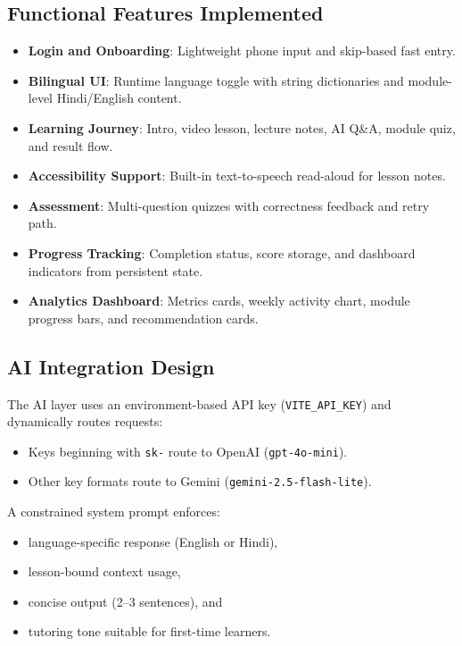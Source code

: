 \documentclass[12pt,a4paper]{article}
\begin{document}
\subsection{Functional Features Implemented}
\begin{itemize}[leftmargin=*]
\item \textbf{Login and Onboarding}: Lightweight phone input and skip-based fast entry.
\item \textbf{Bilingual UI}: Runtime language toggle with string dictionaries and module-level Hindi/English content.
\item \textbf{Learning Journey}: Intro, video lesson, lecture notes, AI Q\&A, module quiz, and result flow.
\item \textbf{Accessibility Support}: Built-in text-to-speech read-aloud for lesson notes.
\item \textbf{Assessment}: Multi-question quizzes with correctness feedback and retry path.
\item \textbf{Progress Tracking}: Completion status, score storage, and dashboard indicators from persistent state.
\item \textbf{Analytics Dashboard}: Metrics cards, weekly activity chart, module progress bars, and recommendation cards.
\end{itemize}

\subsection{AI Integration Design}
The AI layer uses an environment-based API key (\texttt{VITE\_API\_KEY}) and dynamically routes requests:
\begin{itemize}[leftmargin=*]
\item Keys beginning with \texttt{sk-} route to OpenAI (\texttt{gpt-4o-mini}).
\item Other key formats route to Gemini (\texttt{gemini-2.5-flash-lite}).
\end{itemize}

A constrained system prompt enforces:
\begin{itemize}[leftmargin=*]
\item language-specific response (English or Hindi),
\item lesson-bound context usage,
\item concise output (2--3 sentences), and
\item tutoring tone suitable for first-time learners.
\end{itemize}
\end{document}
